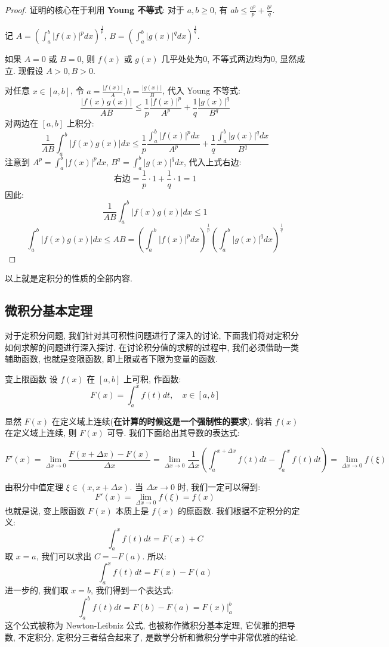\documentclass[a4paper,12pt]{ctexart}
\begin{document}
\newpage

\begin{proof}
证明的核心在于利用 \textbf{Young 不等式}: 对于 $a, b \ge 0$, 有 $ab \le \frac{a^p}{p} + \frac{b^q}{q}$.

记 $A = \left( \int_a^b |f(x)|^p dx \right)^{\frac{1}{p}}$, $B = \left( \int_a^b |g(x)|^q dx \right)^{\frac{1}{q}}$.

如果 $A=0$ 或 $B=0$, 则 $f(x)$ 或 $g(x)$ 几乎处处为0, 不等式两边均为0, 显然成立.
现假设 $A > 0, B > 0$.

对任意 $x \in [a,b]$, 令 $a = \frac{|f(x)|}{A}, b = \frac{|g(x)|}{B}$, 代入 Young 不等式:
$$
\frac{|f(x)g(x)|}{AB} \le \frac{1}{p} \frac{|f(x)|^p}{A^p} + \frac{1}{q} \frac{|g(x)|^q}{B^q}
$$
对两边在 $[a,b]$ 上积分:
$$
\frac{1}{AB} \int_a^b |f(x)g(x)| dx \le \frac{1}{p} \frac{\int_a^b |f(x)|^p dx}{A^p} + \frac{1}{q} \frac{\int_a^b |g(x)|^q dx}{B^q}
$$
注意到 $A^p = \int_a^b |f(x)|^p dx$, $B^q = \int_a^b |g(x)|^q dx$, 代入上式右边:
$$
\text{右边} = \frac{1}{p} \cdot 1 + \frac{1}{q} \cdot 1 = 1
$$
因此:
$$
\frac{1}{AB} \int_a^b |f(x)g(x)| dx \le 1
$$
$$
\int_a^b |f(x)g(x)| dx \le AB = \left( \int_a^b |f(x)|^p dx \right)^{\frac{1}{p}} \left( \int_a^b |g(x)|^q dx \right)^{\frac{1}{q}}
$$
\end{proof}
以上就是定积分的性质的全部内容.

\subsection{微积分基本定理}

对于定积分问题, 我们针对其可积性问题进行了深入的讨论, 下面我们将对定积分如何求解的问题进行深入探讨. 在讨论积分值的求解的过程中, 我们必须借助一类辅助函数, 也就是变限函数, 即上限或者下限为变量的函数.

\begin{mydef}{变上限函数}{}
设 $f(x)$ 在 $[a,b]$ 上可积, 作函数:
$$
F(x) = \int_a^x f(t) dt, \quad x \in [a,b]
$$
\end{mydef}

显然 $F(x)$ 在定义域上连续(\textbf{在计算的时候这是一个强制性的要求}). 倘若 $f(x)$ 在定义域上连续, 则 $F(x)$ 可导. 我们下面给出其导数的表达式:

$$
F'(x) = \lim_{\Delta x \to 0}\frac{F(x+\Delta x)-F(x)}{\Delta x} = \lim_{\Delta x \to 0} \frac{1}{\Delta x}\left(\int_a^{x+\Delta x}f(t)dt -\int_a^xf(t)dt\right) = \lim_{\Delta x \to 0} f(\xi)
$$

由积分中值定理 $\xi \in (x, x+\Delta x)$. 当 $\Delta x \to 0$ 时, 我们一定可以得到:
$$
F'(x) = \lim_{\Delta x \to 0}f(\xi) = f(x)
$$
也就是说, 变上限函数 $F(x)$ 本质上是 $f(x)$ 的原函数. 我们根据不定积分的定义:
$$
\int_a^x f(t) dt = F(x) + C
$$
取 $x=a$, 我们可以求出 $C= - F(a)$. 所以:
$$
\int_a^x f(t) dt = F(x) - F(a) 
$$
进一步的, 我们取 $x=b$, 我们得到一个表达式:
$$
\int_a^b f(t) dt = F(b) - F(a) = F(x) \bigg|^{b}_{a}
$$
这个公式被称为 Newton-Leibniz 公式, 也被称作微积分基本定理, 它优雅的把导数, 不定积分, 定积分三者结合起来了, 是数学分析和微积分学中非常优雅的结论.
\end{document}
